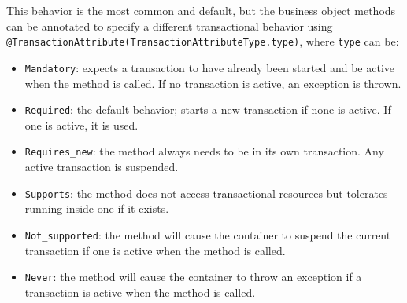 This behavior is the most common and default, but the business object methods can be annotated to specify a different transactional behavior using \texttt{@TransactionAttribute(TransactionAttributeType.type)}, where \texttt{type} can be: 
\begin{itemize}
    \item \texttt{Mandatory}: expects a transaction to have already been started and be active when the method is called. 
        If no transaction is active, an exception is thrown.
    \item \texttt{Required}: the default behavior; starts a new transaction if none is active.
        If one is active, it is used.
    \item \texttt{Requires\_new}: the method always needs to be in its own transaction. 
        Any active transaction is suspended.
    \item \texttt{Supports}: the method does not access transactional resources but tolerates running inside one if it exists.
    \item \texttt{Not\_supported}: the method will cause the container to suspend the current transaction if one is active when the method is called.
    \item \texttt{Never}: the method will cause the container to throw an exception if a transaction is active when the method is called.
\end{itemize}